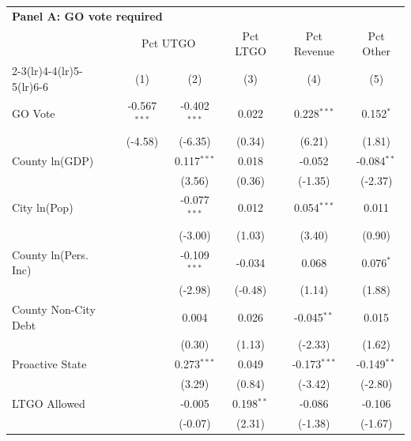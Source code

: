 \begingroup
\centering
\begin{tabular*}{\textwidth}{@{\extracolsep{\fill}}lccccc}
\multicolumn{5}{l}{\textbf{Panel A: GO vote required}}\\

\addlinespace
   \toprule
    & \multicolumn{2}{c}{Pct UTGO} & Pct LTGO & Pct Revenue & Pct Other\\
   \cmidrule(lr){2-3}\cmidrule(lr){4-4}\cmidrule(lr){5-5}\cmidrule(lr){6-6}
                        & (1)            & (2)            & (3)          & (4)            & (5)\\  
   \midrule 
   GO Vote              & -0.567$^{***}$ & -0.402$^{***}$ & 0.022        & 0.228$^{***}$  & 0.152$^{*}$\\   
                        & (-4.58)       & (-6.35)       & (0.34)      & (6.21)        & (1.81)\\   
   County ln(GDP)       &                & 0.117$^{***}$  & 0.018        & -0.052         & -0.084$^{**}$\\   
                        &                & (3.56)        & (0.36)      & (-1.35)       & (-2.37)\\   
   City ln(Pop)         &                & -0.077$^{***}$ & 0.012        & 0.054$^{***}$  & 0.011\\   
                        &                & (-3.00)       & (1.03)      & (3.40)        & (0.90)\\   
   County ln(Pers. Inc) &                & -0.109$^{***}$ & -0.034       & 0.068          & 0.076$^{*}$\\   
                        &                & (-2.98)       & (-0.48)     & (1.14)        & (1.88)\\   
   County Non-City Debt &                & 0.004          & 0.026        & -0.045$^{**}$  & 0.015\\   
                        &                & (0.30)        & (1.13)      & (-2.33)       & (1.62)\\   
   Proactive State      &                & 0.273$^{***}$  & 0.049        & -0.173$^{***}$ & -0.149$^{**}$\\   
                        &                & (3.29)        & (0.84)      & (-3.42)       & (-2.80)\\   
   LTGO Allowed         &                & -0.005         & 0.198$^{**}$ & -0.086         & -0.106\\   
                        &                & (-0.07)       & (2.31)      & (-1.38)       & (-1.67)\\   

\end{tabular*}
